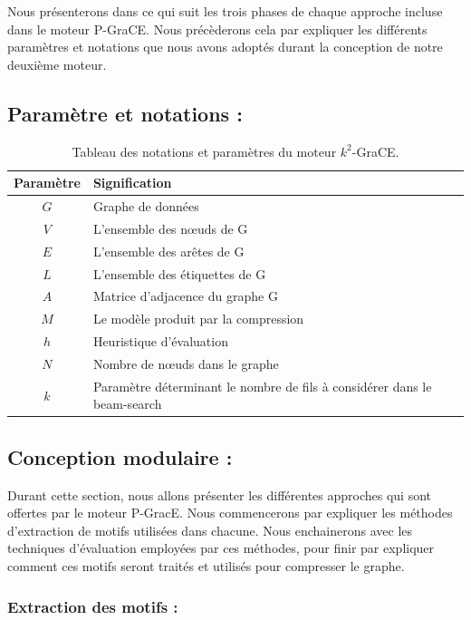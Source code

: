 \documentclass[a4paper,oneside,12pt]{report}
\theoremstyle{definition}
\begin{document}
Nous présenterons dans ce qui suit les trois phases de chaque approche incluse  dans le moteur P-GraCE. Nous précèderons  cela par expliquer les différents paramètres et notations que nous avons adoptés durant la conception de notre deuxième moteur.
		
		\subsection{Paramètre et notations :}
		
			\begin{table}[H]
		\centering
		\begin{tabular}{|c|L{12cm}|}
		\hline Paramètre & Signification \\ \hline\hline 
		$G$ & Graphe de données \\ \hline
		$V$ & L'ensemble des nœuds de G\\ \hline
		$E$ & L'ensemble des arêtes de G \\ \hline
		$L$ & L'ensemble des étiquettes de G \\ \hline
		$A$ & Matrice d'adjacence du graphe G\\ \hline
		$M$ & Le modèle produit par la compression\\ \hline
		$h$ & Heuristique d'évaluation \\ \hline
		$N$ & Nombre de nœuds dans le graphe \\ \hline
		$k$ & Paramètre déterminant le nombre de fils à considérer dans le beam-search\\ \hline
		
		\end{tabular}
		\caption{Tableau des notations et paramètres du moteur $k^2$-GraCE.}	
		\label{notk2grace}		
	\end{table}
		
		\subsection{Conception modulaire :}
		
		Durant cette section, nous allons présenter les différentes approches qui sont offertes par le moteur P-GracE. Nous commencerons par expliquer les méthodes d'extraction de motifs utilisées dans chacune. Nous enchainerons avec les techniques d'évaluation employées par ces méthodes, pour finir par expliquer comment ces motifs seront traités et utilisés pour compresser le graphe. 	
		
		
		\subsubsection{Extraction des motifs :}
\end{document}
